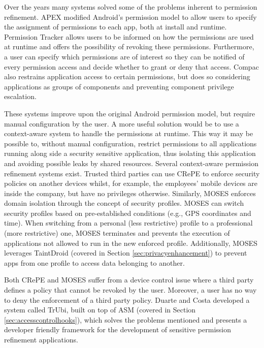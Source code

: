 Over the years many systems solved some of the problems inherent to permission refinement. APEX \cite{nauman2010apex} modified Android's permission model to allow users to specify the assignment of permissions to each app, both at install and runtime. Permission Tracker \cite{kern2012permission} allows users to be informed on how the permissions are used at runtime and offers the possibility of revoking these permissions. Furthermore, a user can specify which permissions are of interest so they can be notified of every permission access and decide whether to grant or deny that access. Compac \cite{wang2014compac} also restrains application access to certain permissions, but does so considering applications as groups of components and preventing component privilege escalation.

These systems improve upon the original Android permission model, but require manual configuration by the user. A more useful solution would be to use a context-aware system to handle the permissions at runtime. This way it may be possible to, without manual configuration, restrict permissions to all applications running along side a security sensitive application, thus isolating this application and avoiding possible leaks by shared resources. Several context-aware permission refinement systems exist. Trusted third parties can use CRePE \cite{conti2011crepe} to enforce security policies on another devices whilst, for example, the employees' mobile devices are inside the company, but have no privileges otherwise. Similarly, MOSES \cite{russello2012moses} enforces domain isolation through the concept of security profiles. MOSES can switch security profiles based on pre-established conditions (e.g., GPS coordinates and time). When switching from a personal (less restrictive) profile to a professional (more restrictive) one, MOSES terminates and prevents the execution of applications not allowed to run in the new enforced profile. Additionally, MOSES leverages TaintDroid \cite{enck2014taintdroid} (covered in Section \ref{sec:privacyenhancement}) to prevent apps from one profile to access data belonging to another.

Both CRePE and MOSES suffer from a device control issue where a third party defines a policy that cannot be revoked by the user. Moreover, a user has no way to deny the enforcement of a third party policy. Duarte \cite{nunoduarte} and Costa \cite{miguelcosta} developed a system called TrUbi, built on top of ASM \cite{heuser2014asm} (covered in Section \ref{sec:accesscontrolhooks}), which solves the problems mentioned and presents a developer friendly framework for the development of sensitive permission refinement applications.

